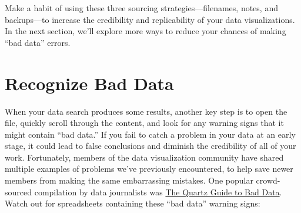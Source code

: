 \documentclass[
  english,
]{book}
\begin{document}
Make a habit of using these three sourcing strategies---filenames, notes, and backups---to increase the credibility and replicability of your data visualizations. In the next section, we'll explore more ways to reduce your chances of making ``bad data'' errors.

\hypertarget{bad-data}{%
\section*{Recognize Bad Data}\label{bad-data}}

When your data search produces some results, another key step is to open the file, quickly scroll through the content, and look for any warning signs that it might contain ``bad data.'' If you fail to catch a problem in your data at an early stage, it could lead to false conclusions and diminish the credibility of all of your work. Fortunately, members of the data visualization community have shared multiple examples of problems we've previously encountered, to help save newer members from making the same embarrassing mistakes. One popular crowd-sourced compilation by data journalists was \href{https://github.com/Quartz/bad-data-guide}{The Quartz Guide to Bad Data}. Watch out for spreadsheets containing these ``bad data'' warning signs:
\end{document}
